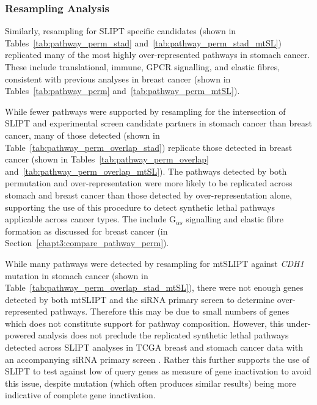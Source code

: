 \FloatBarrier

\subsubsection{Resampling Analysis}  \label{chapt3:compare_pathway_perm_stad_SL}

Similarly, resampling for \gls{SLIPT} specific candidates (shown in Tables~\ref{tab:pathway_perm_stad} and~\ref{tab:pathway_perm_stad_mtSL}) replicated many of the most highly over-represented pathways in stomach cancer. These include translational, immune, \gls{GPCR} signalling, and elastic fibres, consistent with previous analyses in breast cancer (shown in Tables~\ref{tab:pathway_perm} and~\ref{tab:pathway_perm_mtSL}).

While fewer pathways were supported by resampling for the intersection of \gls{SLIPT} and experimental screen \citep{Telford2015} candidate partners in stomach cancer than breast cancer, many of those detected (shown in Table~\ref{tab:pathway_perm_overlap_stad}) replicate those detected in breast cancer (shown in Tables~\ref{tab:pathway_perm_overlap} and~\ref{tab:pathway_perm_overlap_mtSL}). The pathways detected by both permutation and over-representation were more likely to be replicated across stomach and breast cancer than those detected by over-representation alone, supporting the use of this procedure to detect \gls{synthetic lethal} pathways applicable across cancer types. The include G$_{\alpha s}$ signalling and elastic fibre formation as discussed for breast cancer (in Section~\ref{chapt3:compare_pathway_perm}).

While many pathways were detected by resampling for \acrshort{mtSLIPT} against \textit{CDH1} \gls{mutation} in stomach cancer (shown in Table~\ref{tab:pathway_perm_overlap_stad_mtSL}), there were not enough genes detected by both \acrshort{mtSLIPT} and the \gls{siRNA} primary screen to determine over-represented pathways. Therefore this may be due to small numbers of genes which does not constitute support for pathway composition. However, this under-powered analysis does not preclude the replicated \gls{synthetic lethal} pathways detected across \gls{SLIPT}  analyses in \gls{TCGA} breast and stomach cancer data with an accompanying \gls{siRNA} primary screen \citep{Telford2015}. Rather this further supports the use of \gls{SLIPT} to test against low  of query genes as measure of gene inactivation to avoid this issue, despite \gls{mutation} (which often produces similar results) being more indicative of complete gene inactivation.

